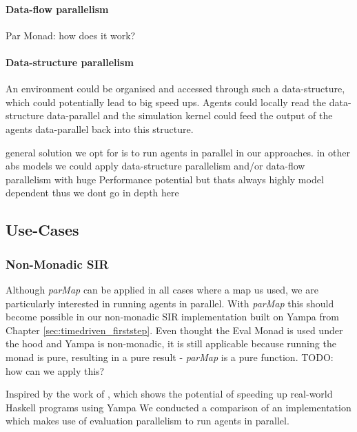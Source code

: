 \paragraph{Data-flow parallelism}
Par Monad: how does it work?

\paragraph{Data-structure parallelism}
An environment could be organised and accessed through such a data-structure, which could potentially lead to big speed ups. Agents could locally read the data-structure data-parallel and the simulation kernel could feed the output of the agents data-parallel back into this structure.


general solution we opt for is  to run agents in parallel in our approaches. in other abs models we could apply data-structure parallelism and/or data-flow parallelism with huge Performance potential but thats always highly model dependent thus we dont go in depth here

\subsection{Use-Cases}

\subsubsection{Non-Monadic SIR}
Although \textit{parMap} can be applied in all cases where a map us used, we are particularly interested in running agents in parallel. With \textit{parMap} this should become possible in our non-monadic SIR implementation built on Yampa from Chapter \ref{sec:timedriven_firststep}. Even thought the Eval Monad is used under the hood and Yampa is non-monadic, it is still applicable because running the monad is pure, resulting in a pure result - \textit{parMap} is a pure function. TODO: how can we apply this?

Inspired by the work of \cite{perez_60_2014}, which shows the potential of speeding up real-world Haskell programs using Yampa We conducted a comparison of an implementation which makes use of evaluation parallelism to run agents in parallel.



